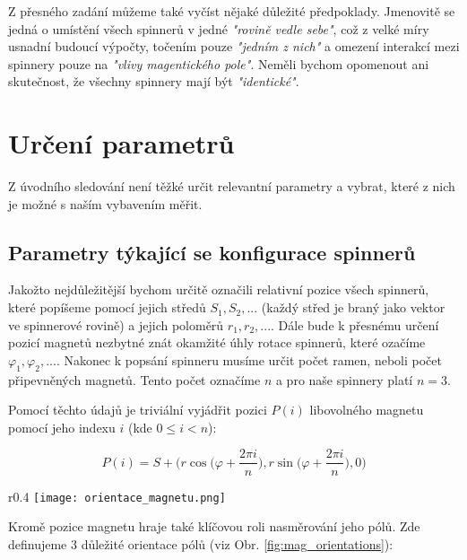 \documentclass[12pt, a4paper,
 twoside,        %
 openright
]{report}
\begin{document}
Z přesného zadání můžeme také vyčíst nějaké důležité předpoklady.
Jmenovitě se jedná o
umístění všech spinnerů v jedné \textit{"rovině vedle sebe"}, což z velké míry usnadní budoucí výpočty,
točením pouze \textit{"jedním z nich"} a
omezení interakcí mezi spinnery pouze na \textit{"vlivy magentického pole"}.
Neměli bychom opomenout ani skutečnost, že všechny spinnery mají být \textit{"identické"}.

\section{Určení parametrů}

Z úvodního sledování není těžké určit relevantní parametry a vybrat, které z nich je možné s naším vybavením měřit.

\subsection{Parametry týkající se konfigurace spinnerů}
\label{sub:param_konf}
Jakožto nejdůležitější bychom určitě označili relativní pozice všech spinnerů, které popíšeme pomocí jejich středů $S_1, S_2,...$ (každý střed je braný jako vektor ve spinnerové rovině) a jejich poloměrů $r_1, r_2, ...$.
Dále bude k přesnému určení pozicí magnetů nezbytné znát okamžité úhly rotace spinnerů, které ozačíme $\varphi_1, \varphi_2,...$.
Nakonec k popsání spinneru musíme určit počet ramen, neboli počet připevněných magnetů. Tento počet označíme $n$ a pro naše spinnery platí $n=3$.

Pomocí těchto údajů je triviální vyjádřit pozici $P(i)$ libovolného magnetu pomocí jeho indexu $i$ (kde $0 \leq i < n$):

\begin{equation}
    \label{eq:magnet_pos}
    P(i) = S + \biggr(r\cos{\bigg(\varphi + \frac{2\pi i}{n}\bigg)},
    r\sin{\bigg(\varphi+\frac{2\pi i}{n}}\bigg), 0 \bigg)
\end{equation}

\begin{wrapfigure}{r}{0.4\textwidth}
    \vspace*{-0.5cm}
    \texttt{[image: orientace\_magnetu.png]}
    \centering
    \caption{Tři námi vyhranění orientace magnetů}
    \label{fig:mag_orientations}
\end{wrapfigure}

Kromě pozice magnetu hraje také klíčovou roli nasměrování jeho pólů. Zde definujeme 3 důležité orientace pólů (viz Obr. \ref{fig:mag_orientations}):
\end{document}
